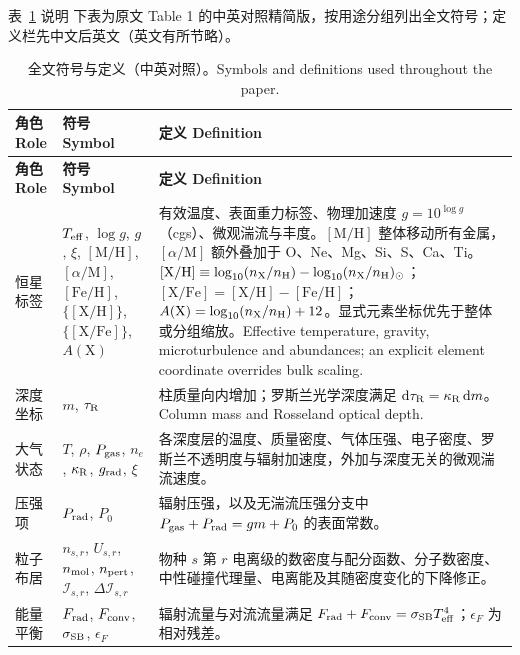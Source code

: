 \begin{notebox}{表~\ref{tab:atmosphere_symbols} 说明}
下表为原文 Table 1 的中英对照精简版，按用途分组列出全文符号；定义栏先中文后英文（英文有所节略）。
\end{notebox}

\begingroup
\footnotesize
\begin{longtable}{@{}p{}p{}p{}@{}}
\caption{全文符号与定义（中英对照）。Symbols and definitions used throughout the paper.}
\label{tab:atmosphere_symbols}\\
\toprule
\textbf{角色 Role} & \textbf{符号 Symbol} & \textbf{定义 Definition} \\
\midrule
\endfirsthead
\toprule
\textbf{角色 Role} & \textbf{符号 Symbol} & \textbf{定义 Definition} \\
\midrule
\endhead
恒星标签 & $T_{\rm eff}$, $\log g$, $g$, $\xi$, $[\mathrm{M}/\mathrm{H}]$, $[\alpha/\mathrm{M}]$, $[\mathrm{Fe}/\mathrm{H}]$, $\{[\mathrm{X}/\mathrm{H}]\}$, $\{[\mathrm{X}/\mathrm{Fe}]\}$, $A(\mathrm{X})$ & 有效温度、表面重力标签、物理加速度 $g=10^{\log g}$（cgs）、微观湍流与丰度。$[\mathrm{M}/\mathrm{H}]$ 整体移动所有金属，$[\alpha/\mathrm{M}]$ 额外叠加于 O、Ne、Mg、Si、S、Ca、Ti。$[\mathrm{X}/\mathrm{H}]\equiv\log_{10}(n_{\rm X}/n_{\rm H})-\log_{10}(n_{\rm X}/n_{\rm H})_\odot$；$[\mathrm{X}/\mathrm{Fe}]=[\mathrm{X}/\mathrm{H}]-[\mathrm{Fe}/\mathrm{H}]$；$A(\mathrm{X})=\log_{10}(n_{\rm X}/n_{\rm H})+12$。显式元素坐标优先于整体或分组缩放。Effective temperature, gravity, microturbulence and abundances; an explicit element coordinate overrides bulk scaling. \\
深度坐标 & $m$, $\tau_{\rm R}$ & 柱质量向内增加；罗斯兰光学深度满足 $\mathrm{d}\tau_{\rm R}=\kappa_{\rm R}\,\mathrm{d}m$。Column mass and Rosseland optical depth. \\
大气状态 & $T$, $\rho$, $P_{\rm gas}$, $n_e$, $\kappa_{\rm R}$, $g_{\rm rad}$, $\xi$ & 各深度层的温度、质量密度、气体压强、电子密度、罗斯兰不透明度与辐射加速度，外加与深度无关的微观湍流速度。 \\
压强项 & $P_{\rm rad}$, $P_0$ & 辐射压强，以及无湍流压强分支中 $P_{\rm gas}+P_{\rm rad}=gm+P_0$ 的表面常数。 \\
粒子布居 & $n_{s,r}$, $U_{s,r}$, $n_{\rm mol}$, $n_{\rm pert}$, $\mathcal{I}_{s,r}$, $\Delta\mathcal{I}_{s,r}$ & 物种 $s$ 第 $r$ 电离级的数密度与配分函数、分子数密度、中性碰撞代理量、电离能及其随密度变化的下降修正。 \\
能量平衡 & $F_{\rm rad}$, $F_{\rm conv}$, $\sigma_{\rm SB}$, $\epsilon_F$ & 辐射流量与对流流量满足 $F_{\rm rad}+F_{\rm conv}=\sigma_{\rm SB}T_{\rm eff}^4$；$\epsilon_F$ 为相对残差。 \\

\end{longtable}
